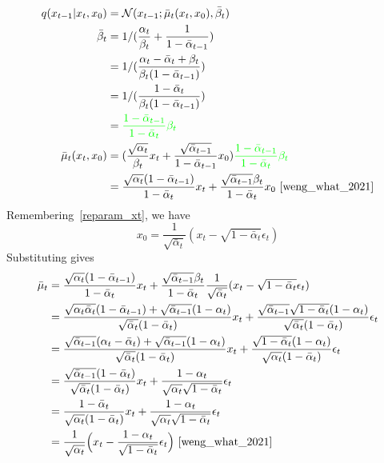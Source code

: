 \documentclass{article}
\numberwithin{equation}{subsection}
\begin{document}
\begin{align}
q(x_{t-1}|x_t, x_0) &= \mathcal{N}(x_{t-1}; \bar{\mu}_t(x_t, x_0), \bar{\beta}_t)\\
\bar{\beta}_t 
&= 1/(\frac{\alpha_t}{\beta_t} + \frac{1}{1 - \bar{\alpha}_{t-1}})\\ 
&= 1/(\frac{\alpha_t - \bar{\alpha}_t + \beta_t}{\beta_t(1 - \bar{\alpha}_{t-1})})\\
&= 1/(\frac{1 - \bar{\alpha}_t}{\beta_t(1 - \bar{\alpha}_{t-1})})\\
&= \color{green}{\frac{1 - \bar{\alpha}_{t-1}}{1 - \bar{\alpha}_t}\beta_t} \\
\bar{\mu}_t(x_t, x_0) &= (\frac{\sqrt{\alpha_t}}{\beta_t} x_t + \frac{\sqrt{\bar{\alpha}_{t-1} }}{1 - \bar{\alpha}_{t-1}} x_0) \color{green}{\frac{1 - \bar{\alpha}_{t-1}}{1 - \bar{\alpha}_t}\beta_t} \\
&= \frac{\sqrt{\alpha_t}(1 - \bar{\alpha}_{t-1})}{1 - \bar{\alpha}_t} x_t + \frac{\sqrt{\bar{\alpha}_{t-1}}\beta_t}{1 - \bar{\alpha}_t} x_0~\cite{weng_what_2021}
\end{align}
Remembering~\ref{reparam_xt}, we have
\begin{equation}
    x_0 = \frac{1}{\sqrt{\bar{\alpha}_t}}(x_t - \sqrt{1 - \bar{\alpha}_t}\epsilon_t)\label{x02xt}
\end{equation}
Substituting gives
\begin{align}
\bar{\mu}_t
&= \frac{\sqrt{\alpha_t}(1 - \bar{\alpha}_{t-1})}{1 - \bar{\alpha}_t} x_t + \frac{\sqrt{\bar{\alpha}_{t-1}}\beta_t}{1 - \bar{\alpha}_t} \frac{1}{\sqrt{\bar{\alpha}_t}}(x_t - \sqrt{1 - \bar{\alpha}_t}\epsilon_t)\\
&= \frac{\sqrt{\alpha_t\bar{\alpha}_t}(1-\bar{\alpha}_{t-1})+\sqrt{\bar{\alpha}_{t-1}}(1-\alpha_t)}{\sqrt{\bar{\alpha}_t}(1-\bar{\alpha}_t)}x_t+\frac{\sqrt{\bar{\alpha}_{t-1}}\sqrt{1-\bar{\alpha}_t}(1-\alpha_t)}{\sqrt{\bar{\alpha}_t}(1-\bar{\alpha}_t)}\epsilon_t\\
&= \frac{\sqrt{\bar{\alpha}_{t-1}}(\alpha_t-\bar{\alpha}_t)+\sqrt{\bar{\alpha}_{t-1}}(1-\alpha_t)}{\sqrt{\bar{\alpha}_t}(1-\bar{\alpha}_t)}x_t+\frac{\sqrt{1-\bar{\alpha}_t}(1-\alpha_t)}{\sqrt{\alpha_t}(1-\bar{\alpha}_t)}\epsilon_t\\
&= \frac{\sqrt{\bar{\alpha}_{t-1}}(1-\bar{\alpha}_t)}{\sqrt{\bar{\alpha}_t}(1-\bar{\alpha}_t)}x_t+\frac{1-\alpha_t}{\sqrt{\alpha_t}\sqrt{1-\bar{\alpha}_t}}\epsilon_t\\
&= \frac{1-\bar{\alpha}_t}{\sqrt{\alpha_t}(1-\bar{\alpha}_t)}x_t+\frac{1-\alpha_t}{\sqrt{\alpha_t}\sqrt{1-\bar{\alpha}_t}}\epsilon_t\\
&= \frac{1}{\sqrt{\alpha_t}} \Big(x_t - \frac{1 - \alpha_t}{\sqrt{1 - \bar{\alpha}_t}} \epsilon_t \Big)~\cite{weng_what_2021}
\end{align}
\end{document}
